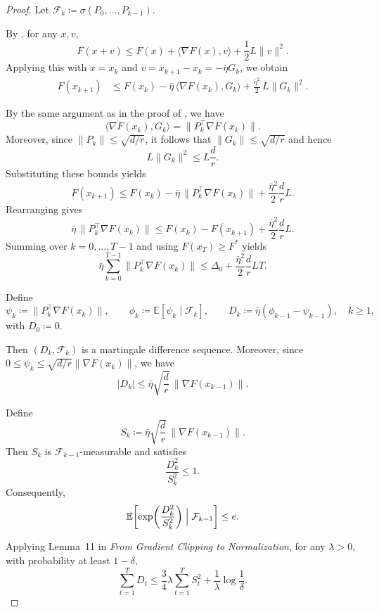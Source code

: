 \documentclass[10pt]{article}
\begin{document}
\begin{proof}
Let $\mathcal{F}_k\coloneqq\sigma(P_0,\dots,P_{k-1})$.

By , for any $x,v$,
\[
F(x+v)\le F(x)+\langle \nabla F(x),v\rangle+\frac12 L\|v\|^2 .
\]
Applying this with $x=x_k$ and $v=x_{k+1}-x_k=-\bar{\eta}G_k$, we obtain
\begin{align*}
F(x_{k+1})
&\le
F(x_k)-\bar{\eta}\,\langle \nabla F(x_k),G_k\rangle
+\frac{\bar{\eta}^2}{2}\,L\|G_k\|^2 .
\end{align*}

By the same argument as in the proof of , we have
\[
\langle \nabla F(x_k), G_k \rangle
=
\|P_k^\top \nabla F(x_k)\|.
\]
Moreover, since $\|P_k\|\le\sqrt{d/r}$, it follows that
$\|G_k\|\le\sqrt{d/r}$ and hence
\[
L\|G_k\|^2 \le L\frac{d}{r}.
\]
Substituting these bounds yields
\[
F(x_{k+1})
\le
F(x_k)-\bar{\eta}\,\|P_k^\top\nabla F(x_k)\|
+\frac{\bar{\eta}^2}{2}\frac{d}{r}L.
\]
Rearranging gives
\[
\bar{\eta}\,\|P_k^\top\nabla F(x_k)\|
\le
F(x_k)-F(x_{k+1})
+\frac{\bar{\eta}^2}{2}\frac{d}{r}L.
\]
Summing over $k=0,\dots,T-1$ and using $F(x_T)\ge F^*$ yields
\begin{equation}\label{eq:hp_rngd_base}
\bar{\eta}\sum_{k=0}^{T-1}\|P_k^\top\nabla F(x_k)\|
\le
\Delta_0+\frac{\bar{\eta}^2}{2}\frac{d}{r}LT.
\end{equation}

Define
\[
\psi_k \coloneqq \|P_k^\top\nabla F(x_k)\|,
\qquad
\phi_k \coloneqq \mathbb{E}[\psi_k\mid \mathcal{F}_k],
\qquad
D_k \coloneqq \bar{\eta}(\phi_{k-1}-\psi_{k-1}),\quad k\ge1,
\]
with $D_0\coloneqq0$.

Then $(D_k,\mathcal{F}_k)$ is a martingale difference sequence.
Moreover, since $0\le\psi_k\le\sqrt{d/r}\|\nabla F(x_k)\|$, we have
\[
|D_k|
\le
\bar{\eta}\sqrt{\frac{d}{r}}\,\|\nabla F(x_{k-1})\|.
\]

Define
\[
S_k \coloneqq \bar{\eta}\sqrt{\frac{d}{r}}\,\|\nabla F(x_{k-1})\|.
\]
Then $S_k$ is $\mathcal{F}_{k-1}$-measurable and satisfies
\[
\frac{D_k^2}{S_k^2}
\le
1.
\]
Consequently,
\[
\mathbb{E}\!\left[
\exp\!\left(\frac{D_k^2}{S_k^2}\right)
\Bigm|\mathcal{F}_{k-1}
\right]
\le e .
\]

Applying Lemma~11 in \emph{From Gradient Clipping to Normalization},
for any $\lambda>0$, with probability at least $1-\delta$,
\begin{equation}\label{eq:hp_mds}
\sum_{t=1}^T D_t
\le
\frac{3}{4}\lambda\sum_{t=1}^T S_t^2
+
\frac{1}{\lambda}\log\frac{1}{\delta}.
\end{equation}


\end{proof}
\end{document}
